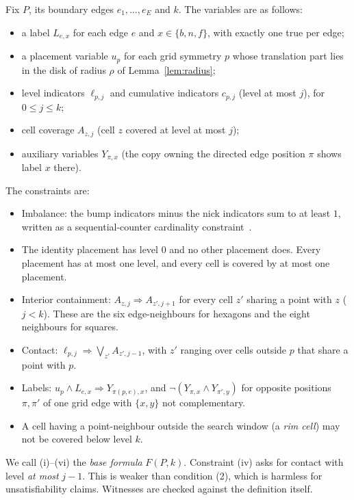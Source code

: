 \documentclass[11pt]{amsart}
\theoremstyle{definition}
\theoremstyle{remark}
\begin{document}
Fix $P$, its boundary edges $e_1,\dots,e_E$ and $k$. The variables are as follows:
\begin{itemize}
\item a label $L_{e,x}$ for each edge $e$ and $x\in\{b,n,f\}$, with exactly one true per edge;
\item a placement variable $u_p$ for each grid symmetry $p$ whose translation part lies in the disk of radius $\rho$ of Lemma~\ref{lem:radius};
\item level indicators $\ell_{p,j}$ and cumulative indicators $c_{p,j}$ (level at most $j$), for $0\le j\le k$;
\item cell coverage $A_{z,j}$ (cell $z$ covered at level at most $j$);
\item auxiliary variables $Y_{\pi,x}$ (the copy owning the directed edge position $\pi$ shows label $x$ there).
\end{itemize}
The constraints are:
\begin{itemize}
\item[(i)] Imbalance: the bump indicators minus the nick indicators sum to at least $1$, written as a sequential-counter cardinality constraint~\cite{PySAT}.
\item[(ii)] The identity placement has level $0$ and no other placement does. Every placement has at most one level, and every cell is covered by at most one placement.
\item[(iii)] Interior containment: $A_{z,j}\Rightarrow A_{z',j+1}$ for every cell $z'$ sharing a point with $z$ ($j<k$). These are the six edge-neighbours for hexagons and the eight neighbours for squares.
\item[(iv)] Contact: $\ell_{p,j}\Rightarrow\bigvee_{z'}A_{z',j-1}$, with $z'$ ranging over cells outside $p$ that share a point with $p$.
\item[(v)] Labels: $u_p\wedge L_{e,x}\Rightarrow Y_{\pi(p,e),x}$, and $\neg(Y_{\pi,x}\wedge Y_{\pi',y})$ for opposite positions $\pi,\pi'$ of one grid edge with $\{x,y\}$ not complementary.
\item[(vi)] A cell having a point-neighbour outside the search window (a \emph{rim cell}) may not be covered below level $k$.
\end{itemize}
We call (i)--(vi) the \emph{base formula} $F(P,k)$. Constraint (iv) asks for contact with level \emph{at most} $j-1$. This is weaker than condition (2), which is harmless for unsatisfiability claims. Witnesses are checked against the definition itself.
\end{document}
